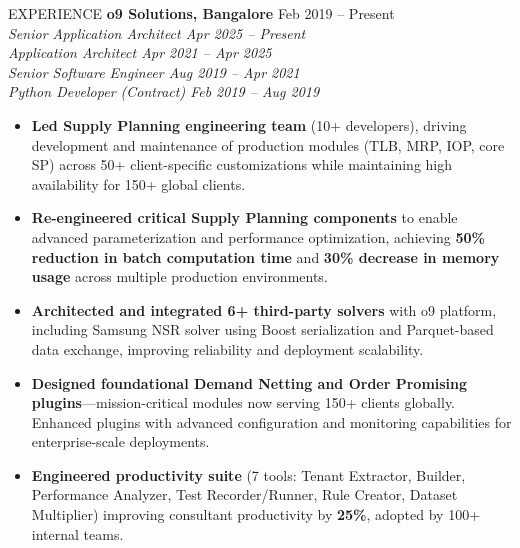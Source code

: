 \documentclass{resume} %
\begin{document}
\begin{rSection}{EXPERIENCE}
\textbf{o9 Solutions, Bangalore} \hfill Feb 2019 -- Present \\
\textit{Senior Application Architect \hfill Apr 2025 -- Present} \\
\textit{Application Architect \hfill Apr 2021 -- Apr 2025} \\
\textit{Senior Software Engineer \hfill Aug 2019 -- Apr 2021} \\
\textit{Python Developer (Contract) \hfill Feb 2019 -- Aug 2019}

\begin{itemize}
    \item \textbf{Led Supply Planning engineering team} (10+ developers), driving development and maintenance of production modules (TLB, MRP, IOP, core SP) across 50+ client-specific customizations while maintaining high availability for 150+ global clients.
    
    \item \textbf{Re-engineered critical Supply Planning components} to enable advanced parameterization and performance optimization, achieving \textbf{50\% reduction in batch computation time} and \textbf{30\% decrease in memory usage} across multiple production environments.
    
    \item \textbf{Architected and integrated 6+ third-party solvers} with o9 platform, including Samsung NSR solver using Boost serialization and Parquet-based data exchange, improving reliability and deployment scalability.
    
    \item \textbf{Designed foundational Demand Netting and Order Promising plugins}—mission-critical modules now serving 150+ clients globally. Enhanced plugins with advanced configuration and monitoring capabilities for enterprise-scale deployments.
    
    \item \textbf{Engineered productivity suite} (7 tools: Tenant Extractor, Builder, Performance Analyzer, Test Recorder/Runner, Rule Creator, Dataset Multiplier) improving consultant productivity by \textbf{25\%}, adopted by 100+ internal teams.
    

\end{itemize}
\end{rSection}
\end{document}
